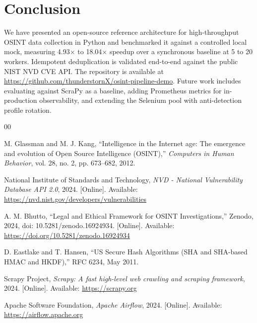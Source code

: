 \documentclass[conference]{IEEEtran}
\begin{document}
\section{Conclusion}

We have presented an open-source reference architecture for
high-throughput OSINT data collection in Python and benchmarked it
against a controlled local mock, measuring 4.93$\times$ to
18.04$\times$ speedup over a synchronous baseline at 5 to 20
workers. Idempotent deduplication is validated end-to-end against
the public NIST NVD CVE API. The repository is available at
\url{https://github.com/thunderstornX/osint-pipeline-demo}.
Future work includes evaluating against ScraPy as a baseline,
adding Prometheus metrics for in-production observability, and
extending the Selenium pool with anti-detection profile rotation.

\begin{thebibliography}{00}

M. Glassman and M. J. Kang, ``Intelligence in the Internet age: The
emergence and evolution of Open Source Intelligence (OSINT),''
\textit{Computers in Human Behavior}, vol. 28, no. 2, pp. 673--682, 2012.

National Institute of Standards and Technology, \textit{NVD - National
Vulnerability Database API 2.0}, 2024. [Online]. Available:
\url{https://nvd.nist.gov/developers/vulnerabilities}

A. M. Bhutto, ``Legal and Ethical Framework for OSINT Investigations,''
Zenodo, 2024, doi: 10.5281/zenodo.16924934. [Online]. Available:
\url{https://doi.org/10.5281/zenodo.16924934}

D. Eastlake and T. Hansen, ``US Secure Hash Algorithms (SHA and SHA-based
HMAC and HKDF),'' RFC 6234, May 2011.

Scrapy Project, \textit{Scrapy: A fast high-level web crawling and
scraping framework}, 2024. [Online]. Available: \url{https://scrapy.org}

Apache Software Foundation, \textit{Apache Airflow}, 2024. [Online].
Available: \url{https://airflow.apache.org}

\end{thebibliography}
\end{document}
